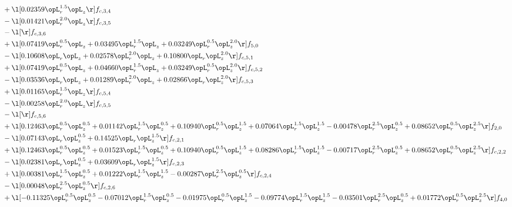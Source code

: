 \begin{alignat}{2}
& + \l[  0.02359 \opL_r^{1.5} \opL_z  \r] f_{c,3,4} \nonumber \\ 
& - \l[  0.01421 \opL_r^{2.0} \opL_z  \r] f_{c,3,5} \nonumber \\ 
& - \l[  \r] f_{c,3,6} \nonumber \\ 
& + \l[  0.07419 \opL_r^{0.5} \opL_z +  0.03495 \opL_r^{1.5} \opL_z +  0.03249 \opL_r^{0.5} \opL_z^{2.0}  \r] f_{5,0} \nonumber \\ 
& - \l[  0.10608 \opL_r \opL_z +  0.02578 \opL_r^{2.0} \opL_z +  0.10800 \opL_r \opL_z^{2.0}  \r] f_{c,5,1} \nonumber \\ 
& + \l[  0.07419 \opL_r^{0.5} \opL_z +  0.04660 \opL_r^{1.5} \opL_z +  0.03249 \opL_r^{0.5} \opL_z^{2.0}  \r] f_{c,5,2} \nonumber \\ 
& - \l[  0.03536 \opL_r \opL_z +  0.01289 \opL_r^{2.0} \opL_z +  0.02866 \opL_r \opL_z^{2.0}  \r] f_{c,5,3} \nonumber \\ 
& + \l[  0.01165 \opL_r^{1.5} \opL_z  \r] f_{c,5,4} \nonumber \\ 
& - \l[  0.00258 \opL_r^{2.0} \opL_z  \r] f_{c,5,5} \nonumber \\ 
& - \l[  \r] f_{c,5,6} \nonumber \\ 
& + \l[  0.12463 \opL_r^{0.5} \opL_z^{0.5} +  0.01142 \opL_r^{1.5} \opL_z^{0.5} +  0.10940 \opL_r^{0.5} \opL_z^{1.5} +  0.07064 \opL_r^{1.5} \opL_z^{1.5}   -0.00478 \opL_r^{2.5} \opL_z^{0.5} +  0.08652 \opL_r^{0.5} \opL_z^{2.5}  \r] f_{2,0} \nonumber \\ 
& - \l[  0.07143 \opL_r \opL_z^{0.5} +  0.14525 \opL_r \opL_z^{1.5}  \r] f_{c,2,1} \nonumber \\ 
& + \l[  0.12463 \opL_r^{0.5} \opL_z^{0.5} +  0.01523 \opL_r^{1.5} \opL_z^{0.5} +  0.10940 \opL_r^{0.5} \opL_z^{1.5} +  0.08286 \opL_r^{1.5} \opL_z^{1.5}   -0.00717 \opL_r^{2.5} \opL_z^{0.5} +  0.08652 \opL_r^{0.5} \opL_z^{2.5}  \r] f_{c,2,2} \nonumber \\ 
& - \l[  0.02381 \opL_r \opL_z^{0.5} +  0.03609 \opL_r \opL_z^{1.5}  \r] f_{c,2,3} \nonumber \\ 
& + \l[  0.00381 \opL_r^{1.5} \opL_z^{0.5} +  0.01222 \opL_r^{1.5} \opL_z^{1.5}   -0.00287 \opL_r^{2.5} \opL_z^{0.5}  \r] f_{c,2,4} \nonumber \\ 
& - \l[  0.00048 \opL_r^{2.5} \opL_z^{0.5}  \r] f_{c,2,6} \nonumber \\ 
& + \l[  -0.11325 \opL_r^{0.5} \opL_z^{0.5}   -0.07012 \opL_r^{1.5} \opL_z^{0.5}   -0.01975 \opL_r^{0.5} \opL_z^{1.5}   -0.09774 \opL_r^{1.5} \opL_z^{1.5}   -0.03501 \opL_r^{2.5} \opL_z^{0.5} +  0.01772 \opL_r^{0.5} \opL_z^{2.5}  \r] f_{4,0} \nonumber \\ 

\end{alignat}
